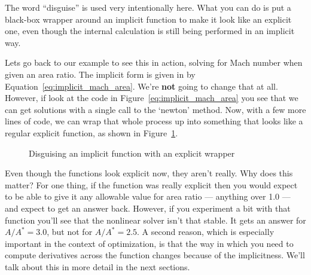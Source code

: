 \documentclass[conf]{new-aiaa}
\begin{document}
    The word ``disguise'' is used very intentionally here. What you can do is put a black-box wrapper around an implicit function to make it look like an explicit one, even though the internal calculation is still being performed in an implicit way. 

    Lets go back to our example to see this in action, solving for Mach number when given an area ratio. 
    The implicit form is given in by Equation~\ref{eq:implicit_mach_area}. 
    We're \textbf{not} going to change that at all. 
    However, if look at the code in Figure~\ref{eq:implicit_mach_area} you see that we can get solutions with a single call to the `newton' method. 
    Now, with a few more lines of code, we can wrap that whole process up into something that looks like a regular explicit function, as shown in Figure~\ref{fig:mach-area-fake-explicit}. 
    \begin{figure}[H]
        \centering
        
        \caption{Disguising an implicit function with an explicit wrapper}
        \label{fig:mach-area-fake-explicit}
    \end{figure}

    Even though the functions look explicit now, they aren't really. 
    Why does this matter? 
    For one thing, if the function was really explicit then you would expect to be able to give it any allowable value for area ratio --- anything over 1.0 --- and expect to get an answer back. 
    However, if you experiment a bit with that function you'll see that the nonlinear solver isn't that stable. 
    It gets an answer for $A/A^*=3.0$, but not for $A/A^*=2.5$. 
    A second reason, which is especially important in the context of optimization, is that the way in which you need to compute derivatives across the function changes because of the implicitness. 
    We'll talk about this in more detail in the next sections. 





\end{document}
